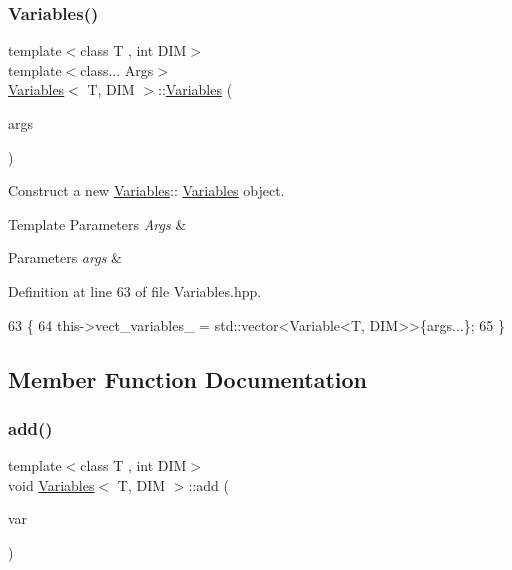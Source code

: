 \subsubsection{\texorpdfstring{Variables()}{Variables()}}
{\footnotesize\ttfamily template$<$class T , int D\+IM$>$ \\
template$<$class... Args$>$ \\
\hyperlink{classVariables}{Variables}$<$ T, D\+IM $>$\+::\hyperlink{classVariables}{Variables} (\begin{DoxyParamCaption}\item[{Args...}]{args }\end{DoxyParamCaption})\hspace{0.3cm}{\ttfamily [explicit]}}



Construct a new \hyperlink{classVariables}{Variables}\+:\+: \hyperlink{classVariables}{Variables} object. 


\begin{DoxyTemplParams}{Template Parameters}
{\em Args} & \\
\hline
\end{DoxyTemplParams}

\begin{DoxyParams}{Parameters}
{\em args} & \\
\hline
\end{DoxyParams}


Definition at line 63 of file Variables.\+hpp.


\begin{DoxyCode}
63                                          \{
64   this->vect\_variables\_ = std::vector<Variable<T, DIM>>\{args...\};
65 \}
\end{DoxyCode}


\subsection{Member Function Documentation}
\mbox{\label{classVariables_a27e62c655731650bb57e70fc656a5040}} 
\subsubsection{\texorpdfstring{add()}{add()}}
{\footnotesize\ttfamily template$<$class T , int D\+IM$>$ \\
void \hyperlink{classVariables}{Variables}$<$ T, D\+IM $>$\+::add (\begin{DoxyParamCaption}\item[{\hyperlink{classVariable}{Variable}$<$ T, D\+IM $>$}]{var }\end{DoxyParamCaption})}



